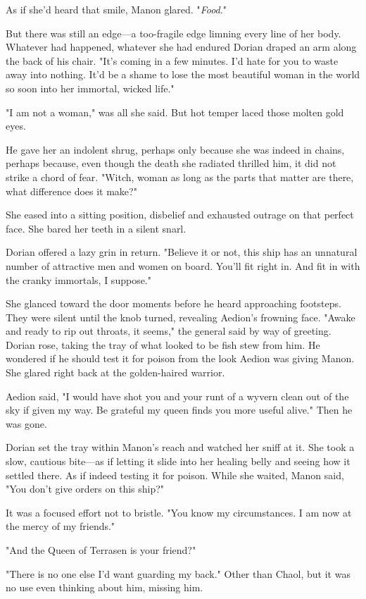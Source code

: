 As if she'd heard that smile, Manon glared. "\emph{Food}."

But there was still an edge---a too-fragile edge limning every line of her body. Whatever had happened, whatever she had endured 
Dorian draped an arm along the back of his chair. "It's coming in a few minutes. I'd hate for you to waste away into nothing. It'd be a shame to lose the most beautiful woman in the world so soon into her immortal, wicked life."

"I am not a woman," was all she said. But hot temper laced those molten gold eyes.

He gave her an indolent shrug, perhaps only because she was indeed in chains, perhaps because, even though the death she radiated thrilled him, it did not strike a chord of fear. "Witch, woman  as long as the parts that matter are there, what difference does it make?"

She eased into a sitting position, disbelief and exhausted outrage on that perfect face. She bared her teeth in a silent snarl.

Dorian offered a lazy grin in return. "Believe it or not, this ship has an unnatural number of attractive men and women on board. You'll fit right in. And fit in with the cranky immortals, I suppose."

She glanced toward the door moments before he heard approaching footsteps. They were silent until the knob turned, revealing Aedion's frowning face. "Awake and ready to rip out throats, it seems," the general said by way of greeting. Dorian rose, taking the tray of what looked to be fish stew from him. He wondered if he should test it for poison from the look Aedion was giving Manon. She glared right back at the golden-haired warrior.

Aedion said, "I would have shot you and your runt of a wyvern clean out of the sky if given my way. Be grateful my queen finds you more useful alive." Then he was gone.

Dorian set the tray within Manon's reach and watched her sniff at it. She took a slow, cautious bite---as if letting it slide into her healing belly and seeing how it settled there. As if indeed testing it for poison. While she waited, Manon said, "You don't give orders on this ship?"

It was a focused effort not to bristle. "You know my circumstances. I am now at the mercy of my friends."

"And the Queen of Terrasen is your friend?"

"There is no one else I'd want guarding my back." Other than Chaol, but  it was no use even thinking about him, missing him.

